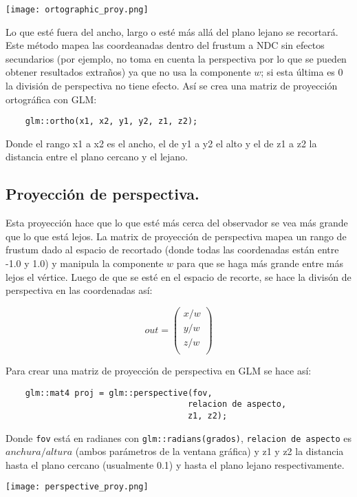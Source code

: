 \texttt{[image: ortographic\_proy.png]}

Lo que esté fuera del ancho, largo o esté más allá del plano lejano se recortará. Este método mapea las coordeanadas dentro del frustum a NDC sin efectos secundarios (por ejemplo, no toma en cuenta la perspectiva por lo que se pueden obtener resultados extraños) ya que no usa la componente $w$; si esta última es 0 la división de perspectiva no tiene efecto. Así se crea una matriz de proyección ortográfica con GLM:

\begin{lstlisting}
    glm::ortho(x1, x2, y1, y2, z1, z2);
\end{lstlisting}

Donde el rango x1 a x2 es el ancho, el de y1 a y2 el alto y el de z1 a z2 la distancia entre el plano cercano y el lejano.

\subsection{Proyección de perspectiva.}
Esta proyección hace que lo que esté más cerca del observador se vea más grande que lo que está lejos. La matrix de proyección de perspectiva mapea un rango de frustum dado al espacio de recortado (donde todas las coordenadas están entre -1.0 y 1.0) y manipula la componente $w$ para que se haga más grande entre más lejos el vértice. Luego de que se esté en el espacio de recorte, se hace la divisón de perspectiva en las coordenadas así:

\begin{center}
\begin{equation*}
out = \left(\begin{array}{c}
      x/w \\
      y/w \\
      z/w \\
      \end{array}\right)
\end{equation*}
\end{center}

Para crear una matriz de proyección de perspectiva en GLM se hace así:

\begin{lstlisting}
    glm::mat4 proj = glm::perspective(fov, 
                                     relacion de aspecto, 
                                     z1, z2);
\end{lstlisting}

Donde \lstinline{fov} está en radianes con \lstinline{glm::radians(grados)}, \lstinline{relacion de aspecto} es $anchura / altura$ (ambos parámetros 
de la ventana gráfica) y z1 y z2 la distancia hasta 
el plano cercano (usualmente 0.1) y hasta el plano lejano respectivamente.

\texttt{[image: perspective\_proy.png]}